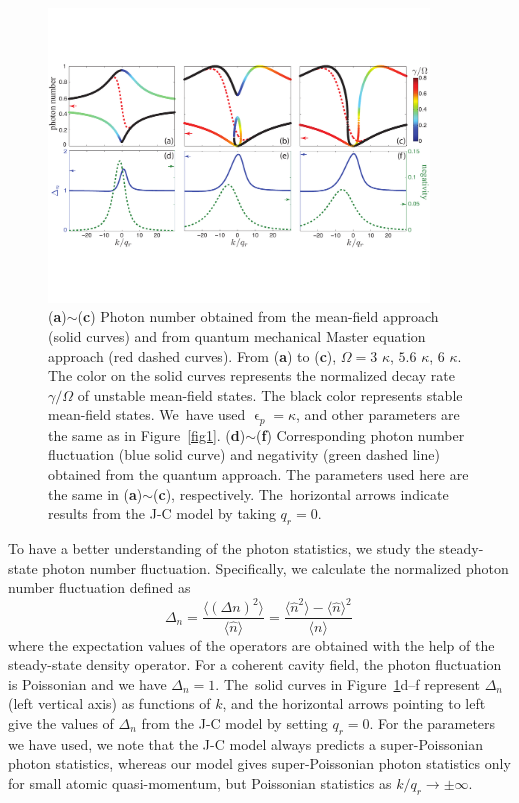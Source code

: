 \documentclass[atoms,article,accept,moreauthors,pdftex,12pt,a4paper]{mdpi}
\begin{document}
\begin{figure}[H]
\centering
\includegraphics[width=0.9\textwidth]{photon}\vspace{6pt}
\caption{(\textbf{a})$\sim$(\textbf{c}) Photon number obtained from the mean-field approach (solid curves) and from quantum mechanical Master equation approach (red dashed curves). From (\textbf{a}) to (\textbf{c}), $\Omega = 3$ $\kappa$, $5.6$ $\kappa$, $6$ $\kappa$. The color on the solid curves represents the normalized decay rate $\gamma/\Omega$ of unstable mean-field states. The black color represents stable mean-field states. We~have used $\upvarepsilon_p=\kappa$, and other parameters are the same as in Figure~\ref{fig1}. (\textbf{d})$\sim$(\textbf{f}) Corresponding photon number fluctuation (blue solid curve) and negativity (green dashed line) obtained from the quantum approach. The parameters used here are the same in (\textbf{a})$\sim$(\textbf{c}), respectively. The~horizontal arrows indicate results from the J-C model by taking $q_r=0$.
}\label{photon}
\end{figure}

To have a better understanding of the photon statistics, we study the steady-state photon number fluctuation. Specifically, we calculate the normalized photon number fluctuation defined as
\[\Delta_n = \frac{\langle(\Delta n)^{2}\rangle}{\langle \hat{n}\rangle}=\frac{\langle \hat{n}^{2}\rangle-\langle \hat{n}\rangle^{2}}{\langle n\rangle} \,\]
where the expectation values of the operators are obtained with the help of the steady-state density operator. For a coherent cavity field, the photon fluctuation is Poissonian and we have $\Delta_n=1$.
The~solid curves in Figure~\ref{photon}d--f represent $\Delta_n$ (left vertical axis) as functions of $k$, and the horizontal arrows pointing to left give the values of $\Delta_n$ from the J-C model by setting $q_r=0$. For the parameters we have used, we note that the J-C model always predicts a super-Poissonian photon statistics, whereas our model gives super-Poissonian photon statistics only for small atomic quasi-momentum, but Poissonian statistics as $k/q_r \rightarrow \pm \infty$.
\end{document}
